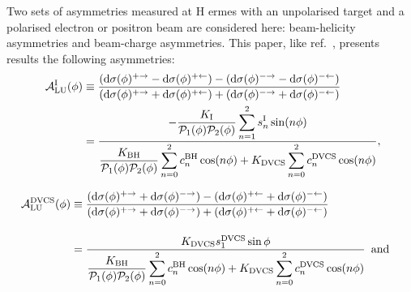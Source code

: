 Two sets of asymmetries measured at H{\sc
ermes} with an unpolarised  target and a polarised electron or positron
beam are considered here:
beam-helicity asymmetries and beam-charge asymmetries. This paper,
like ref.~\cite{Air09}, presents results  the following asymmetries:
\begin{align}
\hspace{0.5cm}\mathcal{A}^{\textrm{I}}_{\textrm{LU}}(\phi) &\equiv
\frac{(\textrm{d}\sigma(\phi)^{+\rightarrow} -
\textrm{d}\sigma(\phi)^{+\leftarrow}) -
(\textrm{d}\sigma(\phi)^{-\rightarrow}
- \textrm{d}\sigma(\phi)^{-\leftarrow})}{(\textrm{d}\sigma(\phi)^{+\rightarrow}
+
\textrm{d}\sigma(\phi)^{+\leftarrow}) +
(\textrm{d}\sigma(\phi)^{-\rightarrow}
+ \textrm{d}\sigma(\phi)^{-\leftarrow})}&  \nonumber \\
&=\dfrac{-\dfrac{K_{\textrm{I}}}{\mathcal{P}_{1}(\phi)\mathcal{P}_{2}(\phi)}
\displaystyle\sum_{n=1}^2
s_{n}^{\textrm{I}}\sin(n\phi)}{\dfrac{K_{\textrm{BH}}}{\mathcal{P}_{1}
(\phi)\mathcal{P}_{
2}(\phi)}
\displaystyle\sum_{n=0}^2
c_{n}^{\textrm{BH}}\cos(n\phi) + 
K_{\textrm{DVCS}}\displaystyle\sum_{n=0}^2 c_{n}^{\textrm{DVCS}}\cos(n\phi)},& 
\label{e:alui}
\end{align}

\begin{align}
\mathcal{A}^{\textrm{DVCS}}_{\textrm{LU}}(\phi) &\equiv
\frac{(\textrm{d}\sigma(\phi)^{+\rightarrow} +
\textrm{d}\sigma(\phi)^{-\rightarrow}) -
(\textrm{d}\sigma(\phi)^{+\leftarrow} + 
\textrm{d}\sigma(\phi)^{-\leftarrow})}
{(\textrm{d}\sigma(\phi)^{+\rightarrow} +
\textrm{d}\sigma(\phi)^{-\rightarrow}) +
(\textrm{d}\sigma(\phi)^{+\leftarrow}
+ \textrm{d}\sigma(\phi)^{-\leftarrow})}& \nonumber \\[0.4cm]
&=\dfrac{ K_{\textrm{DVCS}} s_{1}^{\textrm{DVCS}}\sin\phi}{\dfrac{K_{\textrm{BH}}}{\mathcal{P}_{1}
(\phi)\mathcal{P}_{2}(\phi)}
\displaystyle\sum_{n=0}^2
c_{n}^{\textrm{BH}}\cos(n\phi) + 
K_{\textrm{DVCS}}\displaystyle\sum_{n=0}^2
c_{n}^{\textrm{DVCS}}\cos(n\phi)} \textrm{\, and}&
\label{e:aludvcs}
\end{align}

